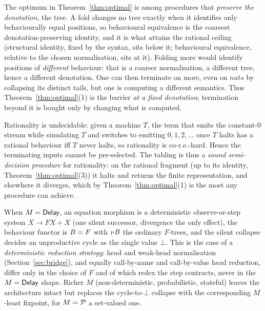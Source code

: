 \begin{remark}\label{rem:fixeddenotation}
  The optimum in Theorem~\ref{thm:optimal} is among procedures that \emph{preserve the denotation}, the
  tree. A fold changes no tree exactly when it identifies only behaviourally equal positions, so
  behavioural equivalence is the coarsest denotation-preserving identity, and it is what attains the
  rational ceiling (structural identity, fixed by the syntax, sits below it; behavioural equivalence,
  relative to the chosen normalisation, sits at it). Folding more would identify positions of
  \emph{different} behaviour: that is a coarser normalisation, a different tree, hence a different
  denotation. One can then terminate on more, even on $\mathit{nats}$ by collapsing its distinct tails,
  but one is computing a different semantics. Thus Theorem~\ref{thm:optimal}(1) is the barrier \emph{at a
  fixed denotation}; termination beyond it is bought only by changing what is computed.
\end{remark}

\begin{remark}\label{rem:semidec}
  Rationality is undecidable: given a machine $T$, the term that emits the constant-$0$ stream while
  simulating $T$ and switches to emitting $0,1,2,\dots$ once $T$ halts has a rational behaviour iff $T$
  never halts, so rationality is co-r.e.-hard. Hence the terminating inputs cannot be pre-selected. The tabling is thus a \emph{sound semi-decision procedure}
  for rationality: on the rational fragment (up to its identity, Theorem~\ref{thm:optimal}(3)) it halts
  and returns the finite representation, and elsewhere it diverges, which by Theorem~\ref{thm:optimal}(1)
  is the most any procedure can achieve.
\end{remark}

\begin{remark}\label{rem:determinism}
  When $M = \mathsf{Delay}$, an equation morphism is a deterministic observe-or-step system
  $X \to F X + X$ (one silent successor, divergence the only effect), the behaviour functor is $B = F$
  with $\nu B$ the ordinary $F$-trees, and the silent collapse decides an unproductive cycle as the
  single value $\bot$. This is the case of a \emph{deterministic reduction strategy}: head and
  weak-head normalisation (Section~\ref{sec:bridge}), and equally call-by-name and call-by-value head
  reduction, differ only in the choice of $F$ and of which redex the step contracts, never in the
  $M = \mathsf{Delay}$ shape. Richer $M$ (non-deterministic, probabilistic, stateful) leaves the architecture
  intact but replaces the cycle-to-$\bot$ collapse with the corresponding $M$-least fixpoint, for
  $M = \mathcal{P}$ a set-valued one.
\end{remark}

